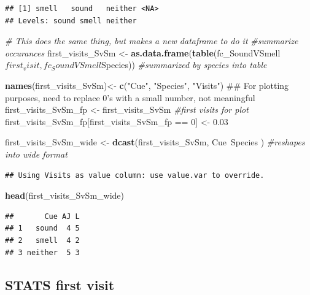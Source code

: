 \documentclass[]{article}
\newenvironment{Shaded}{\begin{snugshade}}{\end{snugshade}}
\newcommand{\KeywordTok}[1]{\textcolor[rgb]{0.13,0.29,0.53}{\textbf{{#1}}}}
\newcommand{\DecValTok}[1]{\textcolor[rgb]{0.00,0.00,0.81}{{#1}}}
\newcommand{\FloatTok}[1]{\textcolor[rgb]{0.00,0.00,0.81}{{#1}}}
\newcommand{\StringTok}[1]{\textcolor[rgb]{0.31,0.60,0.02}{{#1}}}
\newcommand{\CommentTok}[1]{\textcolor[rgb]{0.56,0.35,0.01}{\textit{{#1}}}}
\newcommand{\NormalTok}[1]{{#1}}
\begin{document}
\begin{verbatim}
## [1] smell   sound   neither <NA>   
## Levels: sound smell neither
\end{verbatim}

\begin{Shaded}
\begin{Highlighting}[]
\CommentTok{# This does the same thing, but makes a new dataframe to do it}
\CommentTok{#summarize occurances}
\NormalTok{first_visits_SvSm <-}\StringTok{ }\KeywordTok{as.data.frame}\NormalTok{(}\KeywordTok{table}\NormalTok{(fc_SoundVSmell$first_visit, fc_SoundVSmell$Species)) }\CommentTok{#summarized by species into table}



\KeywordTok{names}\NormalTok{(first_visits_SvSm)<-}\StringTok{ }\KeywordTok{c}\NormalTok{(}\StringTok{"Cue"}\NormalTok{, }\StringTok{"Species"}\NormalTok{, }\StringTok{"Visits"}\NormalTok{)}
\NormalTok{## For plotting purposes, need to replace 0's with a small number, not meaningful}
 \NormalTok{first_visits_SvSm_fp <-}\StringTok{ }\NormalTok{first_visits_SvSm }\CommentTok{#first visits for plot}
 \NormalTok{first_visits_SvSm_fp[first_visits_SvSm_fp ==}\StringTok{ }\DecValTok{0}\NormalTok{] <-}\StringTok{ }\FloatTok{0.03} 
 
 
\NormalTok{first_visits_SvSm_wide <-}\StringTok{ }\KeywordTok{dcast}\NormalTok{(first_visits_SvSm, Cue~Species ) }\CommentTok{#reshapes into wide format}
\end{Highlighting}
\end{Shaded}

\begin{verbatim}
## Using Visits as value column: use value.var to override.
\end{verbatim}

\begin{Shaded}
\begin{Highlighting}[]
\KeywordTok{head}\NormalTok{(first_visits_SvSm_wide)}
\end{Highlighting}
\end{Shaded}

\begin{verbatim}
##       Cue AJ L
## 1   sound  4 5
## 2   smell  4 2
## 3 neither  5 3
\end{verbatim}

\subsection{STATS first visit}\label{stats-first-visit-2}
\end{document}
